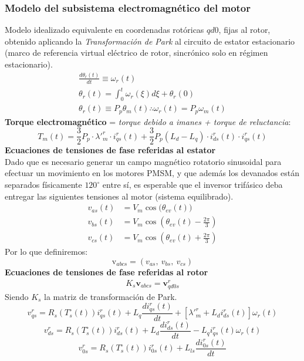 \documentclass[12pt, a4paper,journal, onecolumn, compsoc]{IEEEtran}
\begin{document}
    \subsubsection{Modelo del subsistema electromagnético del motor}
    Modelo idealizado equivalente en coordenadas rotóricas \(qd0\), fijas al rotor, obtenido aplicando la \textit{Transformación de Park} al circuito de estator estacionario (marco de referencia virtual eléctrico de rotor, sincrónico solo en régimen estacionario).
    \begin{gather}
        \frac{d\theta_r(t)}{dt} \equiv \omega_r(t) \\
        \theta_r(t)=\int_0^t{\omega_r(\xi)d\xi+\theta_r(0)} \\
        \theta_r(t) \equiv P_p\theta_m(t) \therefore \omega_r(t) = P_p\omega_m(t)
    \end{gather}
    \textbf{Torque electromagnético} = \textit{torque debido a imanes + torque de reluctancia}:
    \begin{equation}
            T_m(t) = \frac{3}{2} P_p \cdot \lambda'^r_m \cdot i^r_{qs}(t) + \frac{3}{2} P_p (L_d-L_q)\cdot i^r_{ds}(t)\cdot i^r_{qs}(t)
            \label{eq:torque_electromagnetico}
    \end{equation}
\textbf{Ecuaciones de tensiones de fase referidas al estator}\\
Dado que es necesario generar un campo magnético rotatorio sinusoidal para efectuar un movimiento en los motores PMSM, y que además los devanados están separados físicamente \(120^\circ\) entre sí, es esperable que el inversor trifásico deba entregar las siguientes tensiones al motor (sistema equilibrado).
\begin{align}
v_{as}(t) &= V_m \cos\big(\theta_{ev}(t)\big) \\
v_{bs}(t) &= V_m \cos\left(\theta_{ev}(t) - \frac{2\pi}{3}\right) \\
v_{cs}(t) &= V_m \cos\left(\theta_{ev}(t) + \frac{2\pi}{3}\right)
\end{align}
Por lo que definiremos:
\[\bm{\mathrm{v}}_{abcs} = (v_{as},\ v_{bs},\ v_{cs})\]
\textbf{Ecuaciones de tensiones de fase referidas al rotor}
    \begin{align}
        K_s\textbf{v}_{abcs} = \textbf{v}^r_{qd0s}
    \end{align}
    Siendo \(K_s\) la matriz de transformación de Park.
    \begin{equation}\label{eq:vqs_rotor}
        v^r_{qs}=R_s(T_s^\circ(t))i^r_{qs}(t) + L_q\frac{d i^r_{qs}(t)}{dt}+[\lambda'^r_m + L_d i^r_{ds}(t)]\omega_r(t)
    \end{equation}
    \begin{equation}\label{eq:vds_rotor}
        v_{ds}^r=R_s(T_s^\circ(t))i^r_{ds}(t)+L_d\frac{d i^r_{ds}(t)}{dt} - L_qi^r_{qs}(t)\omega_r(t)
    \end{equation}
    \begin{equation}\label{eq:v0s_rotor}
        v^r_{0s}=R_s(T_s^\circ(t))i^r_{0s}(t)+L_{ls}\frac{d i^r_{0s}(t)}{dt}
    \end{equation}
\end{document}
